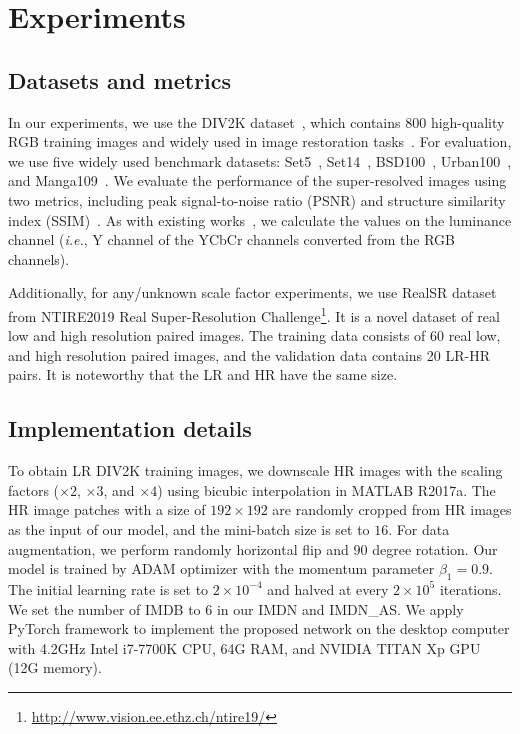 \documentclass[sigconf]{acmart}
\newcommand{\ie}{\emph{i.e.}}
\begin{document}
\section{Experiments}\label{sec:experiemnts}
\subsection{Datasets and metrics}
In our experiments, we use the DIV2K dataset~\cite{NTIRE2017_dataset}, which contains 800 high-quality RGB training images and widely used in image restoration tasks~\cite{EDSR,RDN,RCAN,RNAN}. For evaluation, we use five widely used benchmark datasets: Set5~\cite{Set5}, Set14~\cite{Set14}, BSD100~\cite{BSD100}, Urban100~\cite{Urban100}, and Manga109~\cite{Manga109}. We evaluate the performance of the super-resolved images using two metrics, including peak signal-to-noise ratio (PSNR) and structure similarity index (SSIM)~\cite{SSIM}. As with existing works~\cite{VDSR,DRRN,EDSR,RDN,RCAN,IDN,CARN}, we calculate the values on the luminance channel (\ie, Y channel of the YCbCr channels converted from the RGB channels).

Additionally, for any/unknown scale factor experiments, we use RealSR dataset from NTIRE2019 Real Super-Resolution Challenge\footnote{\url{http://www.vision.ee.ethz.ch/ntire19/}}. It is a novel dataset of real low and high resolution paired images. The training data consists of 60 real low, and high resolution paired images, and the validation data contains 20 LR-HR pairs. It is noteworthy that the LR and HR have the same size. 
\subsection{Implementation details}
To obtain LR DIV2K training images, we downscale HR images with the scaling factors ($\times 2$, $\times 3$, and $\times 4$) using bicubic interpolation in MATLAB R2017a. The HR image patches with a size of $192 \times 192$ are randomly cropped from HR images as the input of our model, and the mini-batch size is set to $16$. For data augmentation, we perform randomly horizontal flip and $90$ degree rotation. Our model is trained by ADAM optimizer with the momentum parameter ${\beta _1} = 0.9$. The initial learning rate is set to $2 \times {10^{ - 4}}$ and halved at every $2 \times {10^5}$ iterations. We set the number of IMDB to $6$ in our IMDN and IMDN\_AS. We apply PyTorch framework to implement the proposed network on the desktop computer with 4.2GHz Intel i7-7700K CPU, 64G RAM, and NVIDIA TITAN Xp GPU (12G memory).
\end{document}
